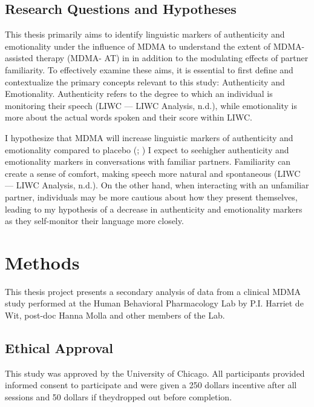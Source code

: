 \documentclass[
  man,
  longtable,
  nolmodern,
  notxfonts,
  notimes,
  colorlinks=true,linkcolor=blue,citecolor=blue,urlcolor=blue]{apa7}
\begin{document}
\subsection{Research Questions and
Hypotheses}\label{research-questions-and-hypotheses}

This thesis primarily aims to identify linguistic markers of
authenticity and emotionality under the influence of MDMA to understand
the extent of MDMA-assisted therapy (MDMA- AT) in in addition to the
modulating effects of partner familiarity. To effectively examine these
aims, it is essential to first define and contextualize the primary
concepts relevant to this study: Authenticity and Emotionality.
Authenticity refers to the degree to which an individual is monitoring
their speech (LIWC --- LIWC Analysis, n.d.), while emotionality is more
about the actual words spoken and their score within LIWC.

I hypothesize that MDMA will increase linguistic markers of authenticity
and emotionality compared to placebo
(;
) I expect
to seehigher authenticity and emotionality markers in conversations with
familiar partners. Familiarity can create a sense of comfort, making
speech more natural and spontaneous (LIWC --- LIWC Analysis, n.d.). On
the other hand, when interacting with an unfamiliar partner, individuals
may be more cautious about how they present themselves, leading to my
hypothesis of a decrease in authenticity and emotionality markers as
they self-monitor their language more closely.

\section{Methods}\label{methods}

This thesis project presents a secondary analysis of data from a
clinical MDMA study performed at the Human Behavioral Pharmacology Lab
by P.I. Harriet de Wit, post-doc Hanna Molla and other members of the
Lab.

\subsection{Ethical Approval}\label{ethical-approval}

This study was approved by the University of Chicago. All participants
provided informed consent to participate and were given a 250 dollars
incentive after all sessions and 50 dollars if theydropped out before
completion.
\end{document}
